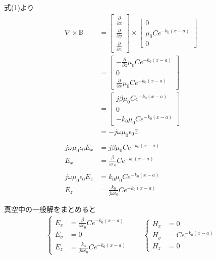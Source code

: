 \documentclass[a4paper,10pt]{bxjsarticle}
\begin{document}
式(1)より
\begin{align*}
    \nabla \times \mathbb{B} 
    & = \begin{bmatrix}
        \frac{\partial}{\partial x}\\
        \frac{\partial}{\partial y}\\
        \frac{\partial}{\partial z}
    \end{bmatrix} \times
    \begin{bmatrix}
        0 \\
        \mu_0 C e^{- k_0 (x - a)} \\
        0 
    \end{bmatrix} \\
    & = \begin{bmatrix}
        -\frac{\partial}{\partial z} \mu_0 C e^{- k_0 (x - a)} \\
        0 \\
        \frac{\partial}{\partial x} \mu_0 C e^{- k_0 (x - a)}
    \end{bmatrix} \\
    & = \begin{bmatrix}
        j\beta \mu_0 C e^{- k_0 (x - a)} \\
        0 \\
        - k_0 \mu_0 C e^{- k_0 (x - a)}
    \end{bmatrix} \\
    &= -j \omega \mu_0 \epsilon_0 \mathbb{E} \\
    \\
    j\omega \mu_0 \epsilon_0 E_x &= j\beta \mu_0 C e^{- k_0 (x - a)} \\
    E_x &= \frac{\beta}{\omega \epsilon_0} C e^{- k_0 (x - a)} \\
    \\
    j\omega \mu_0 \epsilon_0 E_z &= k_0 \mu_0 C e^{- k_0 (x - a)} \\
    E_z &= \frac{k_0}{j\omega \epsilon_0} C e^{- k_0 (x - a)}
\end{align*}

真空中の一般解をまとめると
\begin{align*}
    \begin{cases}
        E_x &= \frac{\beta}{\omega \epsilon_0} C e^{- k_0 (x - a)} \\
        E_y &= 0 \\
        E_z &= \frac{k_0}{j\omega \epsilon_0} C e^{- k_0 (x - a)}
    \end{cases} \qquad
    \begin{cases}
        H_x &= 0 \\
        H_y &= C e^{- k_0 (x - a)} \\
        H_z &= 0
    \end{cases}
\end{align*}
\end{document}
